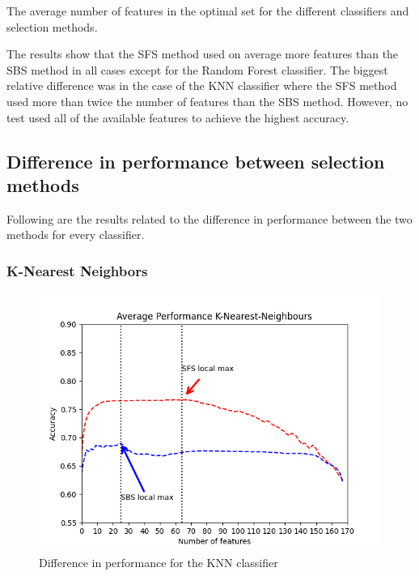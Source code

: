 \documentclass{kththesis}
\begin{document}
\begin{table}[h!]
  \begin{center}
    \caption{The average number of features in the optimal set for the different classifiers and selection methods.}
  \end{center}
\end{table}

The results show that the SFS method used on average more features than the SBS method in all cases except for the Random Forest classifier. The biggest relative difference was in the case of the KNN classifier where the SFS method used more than twice the number of features than the SBS method. However, no test used all of the available features to achieve the highest accuracy.


\subsection{Difference in performance between selection methods}

Following are the results related to the difference in performance between the two methods for every classifier.
\subsubsection{K-Nearest Neighbors}

\begin{figure}[h!]
  \begin{center}
    \includegraphics[scale=0.8]{./figures/Figure_2.png}
    \caption{Difference in performance for the KNN classifier}
  \end{center}
\end{figure}
\end{document}
